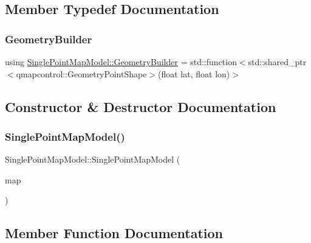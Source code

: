 \subsection{Member Typedef Documentation}
\mbox{\label{class_single_point_map_model_a8e106dd385dec04227af0acf17372916}} 
\subsubsection{\texorpdfstring{GeometryBuilder}{GeometryBuilder}}
{\footnotesize\ttfamily using \mbox{\hyperlink{class_single_point_map_model_a8e106dd385dec04227af0acf17372916}{Single\+Point\+Map\+Model\+::\+Geometry\+Builder}} =  std\+::function$<$std\+::shared\+\_\+ptr$<$qmapcontrol\+::\+Geometry\+Point\+Shape$>$(float lat, float lon)$>$}



\subsection{Constructor \& Destructor Documentation}
\mbox{\label{class_single_point_map_model_acbfc14524c3b8ca8f754611111342809}} 
\subsubsection{\texorpdfstring{SinglePointMapModel()}{SinglePointMapModel()}}
{\footnotesize\ttfamily Single\+Point\+Map\+Model\+::\+Single\+Point\+Map\+Model (\begin{DoxyParamCaption}\item[{qmapcontrol\+::\+Q\+Map\+Control $\ast$}]{map }\end{DoxyParamCaption})\hspace{0.3cm}{\ttfamily [explicit]}}



\subsection{Member Function Documentation}
\mbox{\label{class_single_point_map_model_ade0986118e8cb4b9292c163d52ae6cb7}} 
